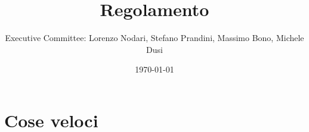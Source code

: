 \documentclass[pdf]{article}
\title{Regolamento}
\author{Executive Committee: Lorenzo Nodari, Stefano Prandini, Massimo Bono, Michele Dusi}
\date{\today}
\begin{document}
\maketitle

\newpage









\section{Cose veloci}
\end{document}
